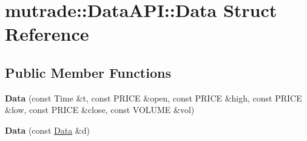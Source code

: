 \hypertarget{structmutrade_1_1_data_a_p_i_1_1_data}{\section{mutrade\-:\-:Data\-A\-P\-I\-:\-:Data Struct Reference}
\label{structmutrade_1_1_data_a_p_i_1_1_data}
}
\subsection*{Public Member Functions}
\begin{DoxyCompactItemize}
\item 
\hypertarget{structmutrade_1_1_data_a_p_i_1_1_data_a98d3456d922b80e8041c66d971020152}{{\bfseries Data} (const Time \&t, const P\-R\-I\-C\-E \&open, const P\-R\-I\-C\-E \&high, const P\-R\-I\-C\-E \&low, const P\-R\-I\-C\-E \&close, const V\-O\-L\-U\-M\-E \&vol)}\label{structmutrade_1_1_data_a_p_i_1_1_data_a98d3456d922b80e8041c66d971020152}

\item 
\hypertarget{structmutrade_1_1_data_a_p_i_1_1_data_a2eb069cc4e515fa28d808d60fe21ea63}{{\bfseries Data} (const \hyperlink{structmutrade_1_1_data_a_p_i_1_1_data}{Data} \&d)}\label{structmutrade_1_1_data_a_p_i_1_1_data_a2eb069cc4e515fa28d808d60fe21ea63}

\end{DoxyCompactItemize}
